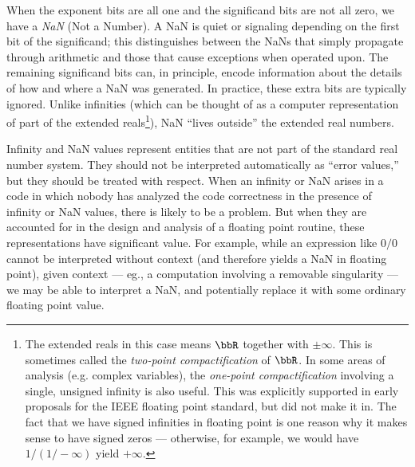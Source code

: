 When the exponent bits are all one and the significand bits are not all
zero, we have a {\em NaN} (Not a Number).  A NaN is quiet or signaling
depending on the first bit of the significand; this distinguishes
between the NaNs that simply propagate through arithmetic and those that
cause exceptions when operated upon.  The remaining significand bits
can, in principle, encode information about the details of how and where
a NaN was generated.  In practice, these extra bits are typically
ignored.  Unlike infinities (which can be thought of as a computer
representation of part of the extended reals\footnote{%
The extended reals in this case means $\bbR$ together with $\pm \infty$.
This is sometimes called the {\em two-point compactification} of $\bbR$.
In some areas of analysis (e.g. complex variables),
the {\em one-point compactification} involving a single, unsigned
infinity is also useful.  This was explicitly supported in early
proposals for the IEEE floating point standard, but did not make it in.
The fact that we have signed infinities in floating point is one reason
why it makes sense to have signed zeros --- otherwise, for example,
we would have $1/(1/-\infty)$ yield $+\infty$.
}), NaN ``lives outside'' the extended real numbers.

Infinity and NaN values represent entities that are not part of the
standard real number system.  They should not be interpreted
automatically as ``error values,'' but they should be treated with
respect.  When an infinity or NaN arises in a code
in which nobody has analyzed the code correctness in the presence
of infinity or NaN values, there is likely to be a problem.  But
when they are accounted for in the design and analysis of a floating
point routine, these representations have significant
value.  For example, while an expression like $0/0$ cannot be
interpreted without context (and therefore yields a NaN in floating
point), given context --- eg., a computation involving a removable
singularity --- we may be able to interpret a NaN, and potentially
replace it with some ordinary floating point value.
